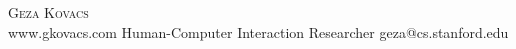 \documentclass[10pt,A4]{article}
\newcommand{\cvsection}[1]
{
	\begin{center}
		\large\textcolor{sectcol}{\textbf{#1}}
	\end{center}
}
\newcommand{\metasection}[2]
{
\footnotesize{#2} \hspace*{\fill} \footnotesize{#1}\\[1pt]
}
\begin{document}
\pagestyle{fancy}	








\vspace{-8pt}
\begin{center}
	\HUGE \textsc{Geza Kovacs}\\[2pt]
	\small www.gkovacs.com \hfill \hspace{5mm} Human-Computer Interaction Researcher \hfill geza@cs.stanford.edu
\end{center}






\normalsize

\end{document}
